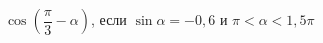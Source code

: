 \begin{ex}[type=simplify_calculate]
	\begin{condition}
		\( \cos\left( \dfrac{\pi}{3}-\alpha \right) \), \quad если \( \sin\alpha=-0,6 \) и \( \pi<\alpha<1,5\pi \)
	\end{condition}
\end{ex}